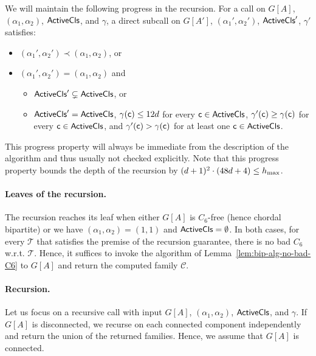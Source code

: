 \documentclass[11pt,a4paper]{article}
\theoremstyle{definition}
\def\T{\mathcal{T}}
\begin{document}
\medskip 

We will maintain the following progress in the recursion.
For a call on $G[A]$, $(\alpha_1,\alpha_2)$, $\mathsf{ActiveCls}$, and $\gamma$, 
a direct subcall on $G[A']$, $(\alpha_1',\alpha_2')$, $\mathsf{ActiveCls}'$, $\gamma'$ satisfies:
\begin{itemize}
    \item $(\alpha_1',\alpha_2') \prec (\alpha_1,\alpha_2)$, or
    \item $(\alpha_1',\alpha_2') = (\alpha_1,\alpha_2)$ and
    \begin{itemize}
        \item $\mathsf{ActiveCls}' \subsetneq \mathsf{ActiveCls}$, or
        \item $\mathsf{ActiveCls}' = \mathsf{ActiveCls}$, $\gamma(\mathsf{c}) \leq 12d$
        for every $\mathsf{c} \in \mathsf{ActiveCls}$, $\gamma'(\mathsf{c}) \geq \gamma(\mathsf{c})$
        for every $\mathsf{c} \in \mathsf{ActiveCls}$, and $\gamma'(\mathsf{c}) > \gamma(\mathsf{c})$
        for at least one $\mathsf{c} \in \mathsf{ActiveCls}$. 
    \end{itemize}
\end{itemize}
This progress property will always be immediate from the description of the algorithm
and thus usually not checked explicitly. 
Note that this progress property bounds the depth of the recursion by $(d+1)^2 \cdot (48d + 4) \leq h_\mathrm{max}$. 

\paragraph{Leaves of the recursion.}
The recursion reaches its leaf when either $G[A]$ is $C_6$-free (hence chordal bipartite)
or we have $(\alpha_1,\alpha_2) = (1,1)$ and 
$\mathsf{ActiveCls} = \emptyset$. In both cases, for every $\T$ that satisfies the premise of
the recursion guarantee, there is no bad $C_6$ w.r.t. $\T$. 
Hence, it suffices to invoke
the algorithm of Lemma~\ref{lem:bip-alg-no-bad-C6} to $G[A]$ and return the computed
family $\mathcal{C}$.

\paragraph{Recursion.}
Let us focus on a recursive call with input $G[A]$, $(\alpha_1,\alpha_2)$, $\mathsf{ActiveCls}$, and 
$\gamma$. 
If $G[A]$ is disconnected, we recurse on each connected component independently
and return the union of the returned families. Hence, we assume that $G[A]$ is connected.
\end{document}
